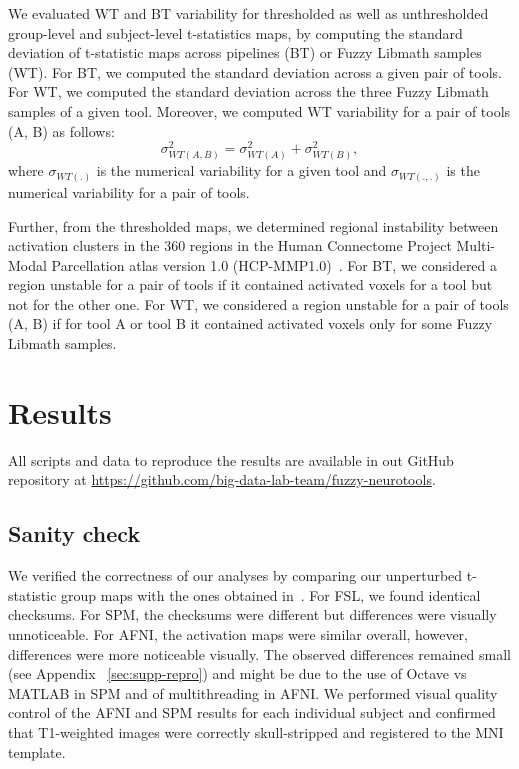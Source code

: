 \documentclass[11pt,onecolumn]{article}
\begin{document}
We evaluated WT and BT variability for thresholded as well as unthresholded
group-level and subject-level t-statistics maps, by computing the
standard deviation of t-statistic maps across pipelines (BT) or Fuzzy Libmath samples (WT). For BT, we computed the standard deviation 
across a given pair of tools.
For WT, we computed the standard deviation across the three
Fuzzy Libmath samples of a given tool. Moreover, we computed WT variability for a pair of tools (A, B) as follows:
\begin{equation}
  \sigma_{WT(A,B)}^2 = \sigma_{WT(A)}^2 + \sigma_{WT(B)}^2,
  \label{eq:wt-pair}
\end{equation}
where $\sigma_{WT(.)}$ is the numerical variability for a given tool
and $\sigma_{WT(., .)}$ is the numerical variability for a pair of tools.

Further, from the thresholded maps, we determined regional instability
between activation clusters in the 360 regions in the Human Connectome
Project Multi-Modal Parcellation atlas version 1.0
(HCP-MMP1.0)~\cite{glasser2016multi}. For BT, we considered a region
unstable for a pair of tools if it contained activated voxels for a tool
but not for the other one. For WT, we considered a region unstable for a
pair of tools (A, B) if for tool A or tool B it contained activated voxels only for some Fuzzy Libmath
samples.

\section{Results}
All scripts and data to reproduce the results are
available in out GitHub repository at \url{https://github.com/big-data-lab-team/fuzzy-neurotools}.


\subsection{Sanity check}

We verified the correctness of our analyses by comparing our unperturbed
t-statistic group maps with the ones obtained
in~\cite{bowring2019exploring}. For FSL, we found
identical checksums. For SPM, the checksums were different but differences
were visually unnoticeable. For AFNI, the activation maps were similar
overall, however, differences were more noticeable visually. 
The observed differences remained small (see Appendix ~\ref{sec:supp-repro}) and might be due to the use of
Octave vs MATLAB in SPM and of multithreading in AFNI. We performed visual quality control of the AFNI
and SPM results for each individual subject and confirmed that T1-weighted images were
correctly skull-stripped and registered to the MNI template.
\end{document}
